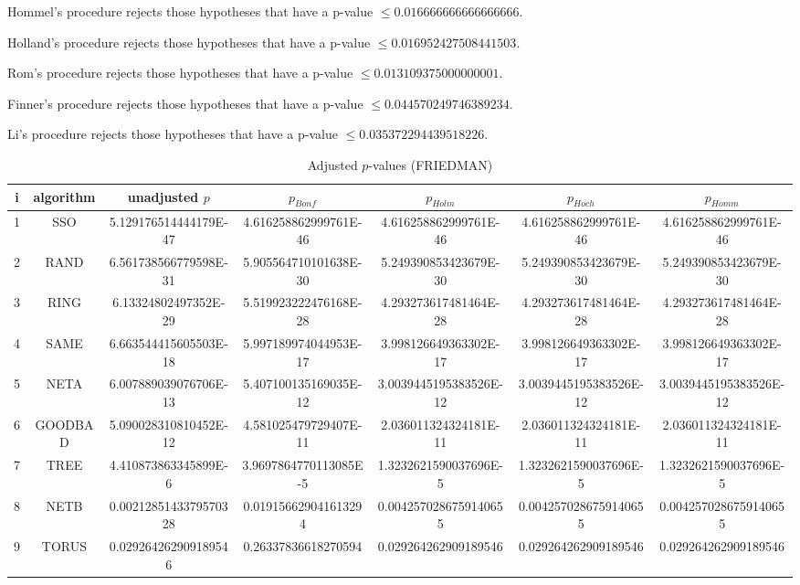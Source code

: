 \documentclass[a4paper,10pt]{article}
\begin{document}
\begin{landscape}
Hommel's procedure rejects those hypotheses that have a p-value $\le0.016666666666666666$.


Holland's procedure rejects those hypotheses that have a p-value $\le0.016952427508441503$.


Rom's procedure rejects those hypotheses that have a p-value $\le0.013109375000000001$.


Finner's procedure rejects those hypotheses that have a p-value $\le0.044570249746389234$.


Li's procedure rejects those hypotheses that have a p-value $\le0.035372294439518226$.



\newpage

\begin{table}[!htp]
\centering\scriptsize
\caption{Adjusted $p$-values (FRIEDMAN)}
\begin{tabular}{ccccccc}
i&algorithm&unadjusted $p$&$p_{Bonf}$&$p_{Holm}$&$p_{Hoch}$&$p_{Homm}$\\
\hline
1& SSO&5.129176514444179E-47&4.616258862999761E-46&4.616258862999761E-46&4.616258862999761E-46&4.616258862999761E-46\\
2& RAND&6.561738566779598E-31&5.905564710101638E-30&5.249390853423679E-30&5.249390853423679E-30&5.249390853423679E-30\\
3& RING&6.13324802497352E-29&5.519923222476168E-28&4.293273617481464E-28&4.293273617481464E-28&4.293273617481464E-28\\
4& SAME&6.663544415605503E-18&5.997189974044953E-17&3.998126649363302E-17&3.998126649363302E-17&3.998126649363302E-17\\
5& NETA&6.007889039076706E-13&5.407100135169035E-12&3.0039445195383526E-12&3.0039445195383526E-12&3.0039445195383526E-12\\
6& GOODBAD&5.090028310810452E-12&4.581025479729407E-11&2.036011324324181E-11&2.036011324324181E-11&2.036011324324181E-11\\
7& TREE&4.410873863345899E-6&3.9697864770113085E-5&1.3232621590037696E-5&1.3232621590037696E-5&1.3232621590037696E-5\\
8& NETB&0.0021285143379570328&0.019156629041613294&0.0042570286759140655&0.0042570286759140655&0.0042570286759140655\\
9& TORUS&0.029264262909189546&0.26337836618270594&0.029264262909189546&0.029264262909189546&0.029264262909189546\\
\hline
\end{tabular}
\end{table}


\end{landscape}
\end{document}
